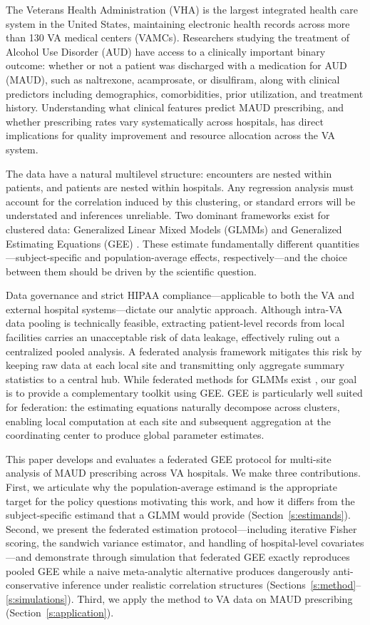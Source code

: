 \documentclass[useAMS,referee]{biom}
\begin{document}
The Veterans Health Administration (VHA) is the largest integrated health care system in the United States, maintaining electronic health records across more than 130 VA medical centers (VAMCs). Researchers studying the treatment of Alcohol Use Disorder (AUD) have access to a clinically important binary outcome: whether or not a patient was discharged with a medication for AUD (MAUD), such as naltrexone, acamprosate, or disulfiram, along with clinical predictors including demographics, comorbidities, prior utilization, and treatment history. Understanding what clinical features predict MAUD prescribing, and whether prescribing rates vary systematically across hospitals, has direct implications for quality improvement and resource allocation across the VA system.

The data have a natural multilevel structure: encounters are nested within patients, and patients are nested within hospitals. Any regression analysis must account for the correlation induced by this clustering, or standard errors will be understated and inferences unreliable. Two dominant frameworks exist for clustered data: Generalized Linear Mixed Models (GLMMs) and Generalized Estimating Equations (GEE) \cite{zeger1988models}. These estimate fundamentally different quantities---subject-specific and population-average effects, respectively---and the choice between them should be driven by the scientific question.

Data governance and strict HIPAA compliance---applicable to both the VA and external hospital systems---dictate our analytic approach. Although intra-VA data pooling is technically feasible, extracting patient-level records from local facilities carries an unacceptable risk of data leakage, effectively ruling out a centralized pooled analysis. A federated analysis framework mitigates this risk by keeping raw data at each local site and transmitting only aggregate summary statistics to a central hub. While federated methods for GLMMs exist \cite{luo2022dlmm}, our goal is to provide a complementary toolkit using GEE. GEE is particularly well suited for federation: the estimating equations naturally decompose across clusters, enabling local computation at each site and subsequent aggregation at the coordinating center to produce global parameter estimates.

This paper develops and evaluates a federated GEE protocol for multi-site analysis of MAUD prescribing across VA hospitals. We make three contributions. First, we articulate why the population-average estimand is the appropriate target for the policy questions motivating this work, and how it differs from the subject-specific estimand that a GLMM would provide (Section~\ref{s:estimands}). Second, we present the federated estimation protocol---including iterative Fisher scoring, the sandwich variance estimator, and handling of hospital-level covariates---and demonstrate through simulation that federated GEE exactly reproduces pooled GEE while a naive meta-analytic alternative produces dangerously anti-conservative inference under realistic correlation structures (Sections~\ref{s:method}--\ref{s:simulations}). Third, we apply the method to VA data on MAUD prescribing (Section~\ref{s:application}).
\end{document}
